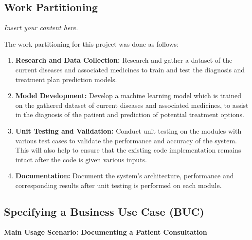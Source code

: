 \documentclass[12pt]{article}
\newcommand{\lips}{\textit{Insert your content here.}}
\begin{document}
\subsection{Work Partitioning}
\lips

The work partitioning for this project was done as follows:

\begin{enumerate}

  \item \textbf{Research and Data Collection:} Research and gather a dataset of the current diseases and associated medicines to train and test the diagnosis and treatment plan prediction models.\\
  \item \textbf{Model Development:} Develop a machine learning model which is trained on the gathered dataset of current diseases and associated medicines, to assist in the diagnosis of the patient and prediction of potential treatment options.\\
  \item \textbf{Unit Testing and Validation:} Conduct unit testing on the modules with various test cases to validate the performance and accuracy of the system. This will also help to ensure that the existing code implementation remains intact after the code is given various inputs.\\
  \item \textbf{Documentation:} Document the system's architecture, performance and corresponding results after unit testing is performed on each module.\\  

\end{enumerate}

\subsection{Specifying a Business Use Case (BUC)}

\textbf{Main Usage Scenario: Documenting a Patient Consultation}
\end{document}
